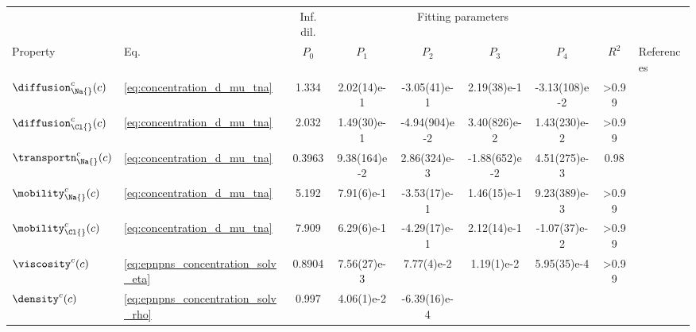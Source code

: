 %
\begin{landscape}
  \begin{threeparttable}[p]
    \centering
       \captionsetup{width=18cm}
    \caption{Overview of the  fitting parameters used for interpolation.}
    \label{tab:corrections_parameters}
    \renewcommand{\arraystretch}{2}
    \scriptsize
    \begin{tabularx}{18cm}{@{}
            l l S[table-format=1.3] S[table-format=-1.2(2)e-1] S[table-format=-1.2(2)e-1]
            S[table-format=-1.2(2)e-1] S[table-format=-1.2(2)e-1] S[table-format=>1.2] l @{}}
      \toprule
        & & {Inf. dil.} &  & & \\
      \cmidrule(r){3-3} \cmidrule(l){4-7} Property & Eq. & $P_{0}$ & $P_{1}$ & $P_{2}$ & $P_{3}$ & $P_{4}$ &
      $R^{2}$ & References \\
      \midrule
      $\diffusion_{\Na{}}^c(c)$ & \cref{eq:concentration_d_mu_tna} & 1.334  & 2.02(14)e-1 &
      -3.05(41)e-1 & 2.19(38)e-1 & -3.13(108)e-2 & >0.99 & \cite{Mills-1989} \\
      $\diffusion_{\Cl{}}^c(c)$ & \cref{eq:concentration_d_mu_tna} & 2.032  & 1.49(30)e-1 &
      -4.94(904)e-2 & 3.40(826)e-2 & 1.43(230)e-2 & >0.99 & \cite{Mills-1989} \\
      $\transportn_{\Na{}}^c(c)$ & \cref{eq:concentration_d_mu_tna} & 0.3963 & 9.38(164)e-2 & 2.86(324)e-3 &
      -1.88(652)e-2 & 4.51(275)e-3 & 0.98 &
      \cite{Esteso-1976,Haynes-2017,DellaMonica-1979,Panopoulos-1986,Schonert-2013}\\
      $\mobility_{\Na{}}^c(c)$ & \cref{eq:concentration_d_mu_tna} & 5.192  & 7.91(6)e-1 &
      -3.53(17)e-1 & 1.46(15)e-1 & 9.23(389)e-3 & >0.99 &
      \cite{Bianchi-1989,Currie-1960,Goldsack-1976,DellaMonica-1979} \\
      $\mobility_{\Cl{}}^c(c)$ & \cref{eq:concentration_d_mu_tna} & 7.909  & 6.29(6)e-1 &
      -4.29(17)e-1 & 2.12(14)e-1 & -1.07(37)e-2 & >0.99 &
      \cite{Bianchi-1989,Currie-1960,Goldsack-1976,DellaMonica-1979} \\
      $\viscosity^c(c)$ & \cref{eq:epnpns_concentration_solv_eta} & 0.8904  & 7.56(27)e-3 &
      7.77(4)e-2 & 1.19(1)e-2 & 5.95(35)e-4 & >0.99 & \cite{Hai-Lang-1996} \\
      $\density^c(c)$ & \cref{eq:epnpns_concentration_solv_rho} & 0.997  & 4.06(1)e-2 & -6.39(16)e-4

\end{tabularx}
\end{threeparttable}
\end{landscape}
